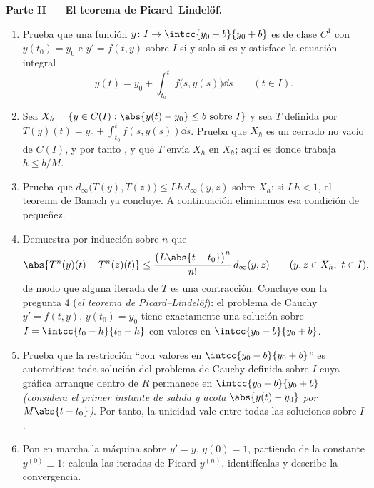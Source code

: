 \begin{problem}
\medskip
\noindent\textbf{Parte II --- El teorema de Picard--Lindelöf.}
\begin{enumerate}[resume]
  \item Prueba que una función $y \colon I \to \intcc{y_0 - b}{y_0
        + b}$ es de clase $C^1$ con $y(t_0) = y_0$ e $y' = f(t,
        y)$ sobre $I$ si y solo si es  y satisface la
        ecuación integral
        \[
        y(t) = y_0 + \int_{t_0}^{t} f\bigl(s, y(s)\bigr)\dd s
        \qquad (t \in I).
        \]
  \item Sea $X_h = \{y \in C(I) : \abs{y(t) - y_0} \leq b \text{
        sobre } I\}$ y sea $T$ definida por $T(y)(t) = y_0 +
        \int_{t_0}^{t}f(s, y(s))\dd s$. Prueba que $X_h$ es un
        cerrado no vacío de $C(I)$, y por tanto , y que $T$
        envía $X_h$ en $X_h$; aquí es donde trabaja $h \leq b/M$.
  \item Prueba que $d_\infty\bigl(T(y), T(z)\bigr) \leq
        Lh\,d_\infty(y, z)$ sobre $X_h$: si $Lh < 1$, el teorema de
        Banach ya concluye. A continuación eliminamos esa condición
        de pequeñez.
  \item Demuestra por inducción sobre $n$ que
        \[
        \abs{T^n(y)(t) - T^n(z)(t)} \leq
        \frac{\bigl(L\abs{t - t_0}\bigr)^n}{n!}\,
        d_\infty(y, z) \qquad (y, z \in X_h,\ t \in I),
        \]
        de modo que alguna iterada de $T$ es una contracción.
        Concluye con la pregunta 4 (\emph{el teorema de
        Picard--Lindelöf}): el problema de Cauchy $y' = f(t,y)$,
        $y(t_0) = y_0$ tiene exactamente una solución sobre $I =
        \intcc{t_0 - h}{t_0 + h}$ con valores en $\intcc{y_0 -
        b}{y_0 + b}$.
  \item Prueba que la restricción ``con valores en $\intcc{y_0 -
        b}{y_0 + b}$'' es automática: toda solución del problema de
        Cauchy definida sobre $I$ cuya gráfica arranque dentro de
        $R$ permanece en $\intcc{y_0 - b}{y_0 + b}$ \emph{(considera
        el primer instante de salida y acota $\abs{y(t) - y_0}$ por
        $M\abs{t - t_0}$)}. Por tanto, la unicidad vale entre todas
        las soluciones sobre $I$.
  \item Pon en marcha la máquina sobre $y' = y$, $y(0) = 1$,
        partiendo de la constante $y^{(0)} \equiv 1$: calcula las
        iteradas de Picard $y^{(n)}$, identifícalas y describe la
        convergencia.
\end{enumerate}


\end{problem}
